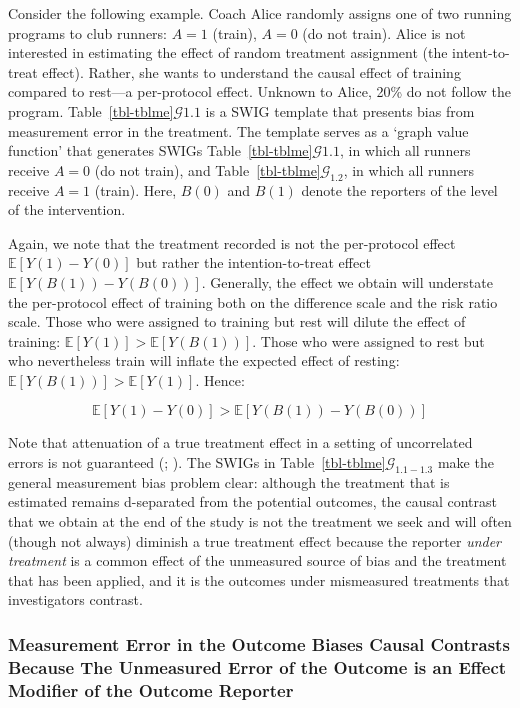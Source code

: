 \documentclass[
  single column]{article}
\begin{document}
Consider the following example. Coach Alice randomly assigns one of two
running programs to club runners: \(A = 1\) (train), \(A = 0\) (do not
train). Alice is not interested in estimating the effect of random
treatment assignment (the intent-to-treat effect). Rather, she wants to
understand the causal effect of training compared to rest---a
per-protocol effect. Unknown to Alice, 20\% do not follow the program.
Table~\ref{tbl-tblme}\(\mathcal{G}{1.1}\) is a SWIG template that
presents bias from measurement error in the treatment. The template
serves as a `graph value function' that generates SWIGs
Table~\ref{tbl-tblme}\(\mathcal{G}{1.1}\), in which all runners receive
\(A = 0\) (do not train), and
Table~\ref{tbl-tblme}\(\mathcal{G}_{1.2}\), in which all runners receive
\(A = 1\) (train). Here, \(B(0)\) and \(B(1)\) denote the reporters of
the level of the intervention.

Again, we note that the treatment recorded is not the per-protocol
effect \(\mathbb{E}[Y(1) - Y(0)]\) but rather the intention-to-treat
effect \(\mathbb{E}[Y(B(1)) - Y(B(0))]\). Generally, the effect we
obtain will understate the per-protocol effect of training both on the
difference scale and the risk ratio scale. Those who were assigned to
training but rest will dilute the effect of training:
\(\mathbb{E}[Y(1)] > \mathbb{E}[Y(B(1))]\). Those who were assigned to
rest but who nevertheless train will inflate the expected effect of
resting: \(\mathbb{E}[Y(B(1))] > \mathbb{E}[Y(1)]\). Hence:

\[
 \mathbb{E}[Y(1) - Y(0)] > \mathbb{E}[Y(B(1)) - Y(B(0))]
\]

Note that attenuation of a true treatment effect in a setting of
uncorrelated errors is not guaranteed
(;
). The SWIGs in
Table~\ref{tbl-tblme}\(\mathcal{G}_{1.1-1.3}\) make the general
measurement bias problem clear: although the treatment that is estimated
remains d-separated from the potential outcomes, the causal contrast
that we obtain at the end of the study is not the treatment we seek and
will often (though not always) diminish a true treatment effect because
the reporter \emph{under treatment} is a common effect of the unmeasured
source of bias and the treatment that has been applied, and it is the
outcomes under mismeasured treatments that investigators contrast.

\subsubsection{Measurement Error in the Outcome Biases Causal Contrasts
Because The Unmeasured Error of the Outcome is an Effect Modifier of the
Outcome
Reporter}\label{measurement-error-in-the-outcome-biases-causal-contrasts-because-the-unmeasured-error-of-the-outcome-is-an-effect-modifier-of-the-outcome-reporter}
\end{document}
